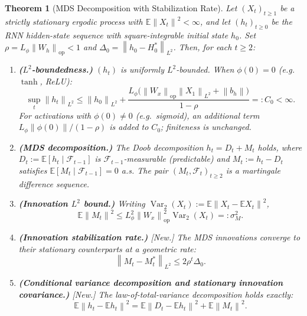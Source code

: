 \documentclass[bj,authoryear]{imsart}
\theoremstyle{plain}
\newtheorem{theorem}{Theorem}[section]
\theoremstyle{definition}
\newcommand{\E}{\mathbb{E}}
\newcommand{\F}{\mathcal{F}}
\newcommand{\norm}[1]{\left\lVert #1 \right\rVert}
\newcommand{\given}{\mid}
\DeclareMathOperator{\Var}{Var}
\begin{document}
\begin{theorem}[MDS Decomposition with Stabilization Rate]
\label{thm:mds}
  Let $(X_t)_{t\geq 1}$ be a strictly stationary ergodic process with
  $\E\norm{X_t}^2<\infty$, and let $(h_t)_{t\geq 0}$ be the RNN
  hidden-state sequence with square-integrable initial state $h_0$.
  Set $\rho=L_\phi\norm{W_h}_{\mathrm{op}}<1$ and
  $\Delta_0=\norm{h_0-H_0^*}_{L^2}$.  Then, for each $t\geq 2$:
  \begin{enumerate}[label=(\roman*), itemsep=3pt]
    \item \textbf{($L^2$-boundedness.)}
      $(h_t)$ is uniformly $L^2$-bounded.  When $\phi(0)=0$ (e.g.\ $\tanh$, ReLU):
      \[
        \sup_t\norm{h_t}_{L^2}
        \leq \norm{h_0}_{L^2}
          +\frac{L_\phi\bigl(\norm{W_x}_{\mathrm{op}}\norm{X_1}_{L^2}
                  +\norm{b_h}\bigr)}{1-\rho}
        =: C_0 < \infty.
      \]
      For activations with $\phi(0)\neq 0$ (e.g.\ sigmoid), an additional term $L_\phi\|\phi(0)\|/(1-\rho)$ is added to $C_0$; finiteness is unchanged.
    \item \textbf{(MDS decomposition.)}
      The Doob decomposition $h_t=D_t+M_t$ holds, where
      $D_t:=\E[h_t\given\F_{t-1}]$ is $\F_{t-1}$-measurable (predictable)
      and $M_t:=h_t-D_t$ satisfies $\E[M_t\given\F_{t-1}]=0$ a.s.
      The pair $(M_t,\F_t)_{t\geq 2}$ is a martingale difference sequence.
    \item \textbf{(Innovation $L^2$ bound.)}
      Writing $\Var_2(X_t):=\E\norm{X_t-\E X_t}^2$,
      \begin{equation}
        \E\norm{M_t}^2
        \leq L_\phi^2\norm{W_x}_{\mathrm{op}}^2\Var_2(X_t)
        =: \sigma_M^2.
        \label{eq:Mbound}
      \end{equation}
    \item \textbf{(Innovation stabilization rate.)} \emph{[New.]}
      The MDS innovations converge to their stationary counterparts
      at a geometric rate:
      \begin{equation}
        \norm{M_t-M_t^*}_{L^2} \leq 2\rho^t\Delta_0.
        \label{eq:Mstab}
      \end{equation}
    \item \textbf{(Conditional variance decomposition and stationary
          innovation covariance.)} \emph{[New.]}
      The law-of-total-variance decomposition holds exactly:
      \begin{equation}
        \E\norm{h_t-\E h_t}^2
        = \E\norm{D_t-\E h_t}^2 + \E\norm{M_t}^2.
        \label{eq:var-decomp}
      \end{equation}

\end{enumerate}
\end{theorem}
\end{document}
